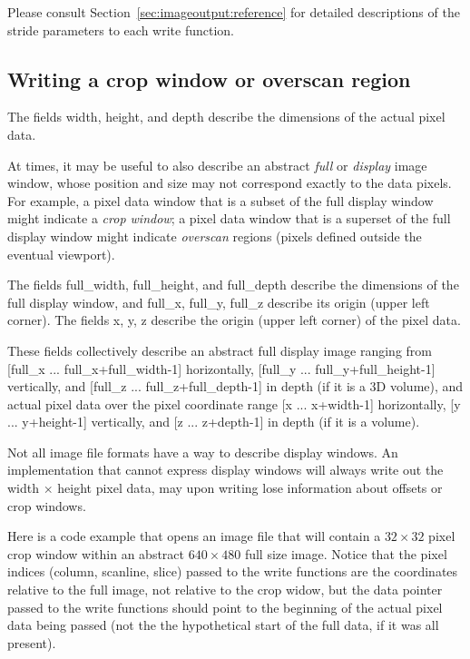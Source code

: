 Please consult Section~\ref{sec:imageoutput:reference} for detailed
descriptions of the stride parameters to each {\cf write} function.


\subsection{Writing a crop window or overscan region}
\label{sec:imageoutput:cropwindows}
 


The \ImageSpec fields {\cf width}, {\cf height}, and {\cf depth}
describe the dimensions of the actual pixel data.

At times, it may be useful to also describe an abstract \emph{full} or
\emph{display} image window, whose position and size may not correspond
exactly to the data pixels.  For example, a pixel data window that is a
subset of the full display window might indicate a \emph{crop window}; a
pixel data window that is a superset of the full display window might
indicate \emph{overscan} regions (pixels defined outside the eventual
viewport).

The \ImageSpec fields {\cf full_width}, {\cf full_height}, and
{\cf full_depth} describe the dimensions of the full display
window, and {\cf full_x}, {\cf full_y}, {\cf full_z} describe its
origin (upper left corner).  The fields {\cf x}, {\cf y}, {\cf z}
describe the origin (upper left corner)
of the pixel data.

These fields collectively describe an abstract full display image
ranging from [{\cf full_x} ... {\cf full_x+full_width-1}] horizontally,
[{\cf full_y} ... {\cf full_y+full_height-1}] vertically,
and [{\cf full_z} ... {\cf full_z+full_depth-1}] in depth (if it is
a 3D volume), and actual pixel data over the pixel coordinate range 
[{\cf x} ... {\cf x+width-1}] horizontally,
[{\cf y} ... {\cf y+height-1}] vertically,
and [{\cf z} ... {\cf z+depth-1}] in depth (if it is a volume).

Not all image file formats have a way to describe display windows.  An
\ImageOutput implementation that cannot express display windows will
always write out the {\cf width} $\times$ {\cf height} pixel data, may
upon writing lose information about offsets or crop windows.

Here is a code example that opens an image file that will contain a $32
\times 32$ pixel crop window within an abstract $640 \times 480$ full
size image.  Notice that the pixel indices (column, scanline, slice)
passed to the {\cf write} functions are the coordinates relative to
the full image, not relative to the crop widow, but the data pointer
passed to the {\cf write} functions should point to the beginning of
the actual pixel data being passed (not the the hypothetical start of
the full data, if it was all present).

